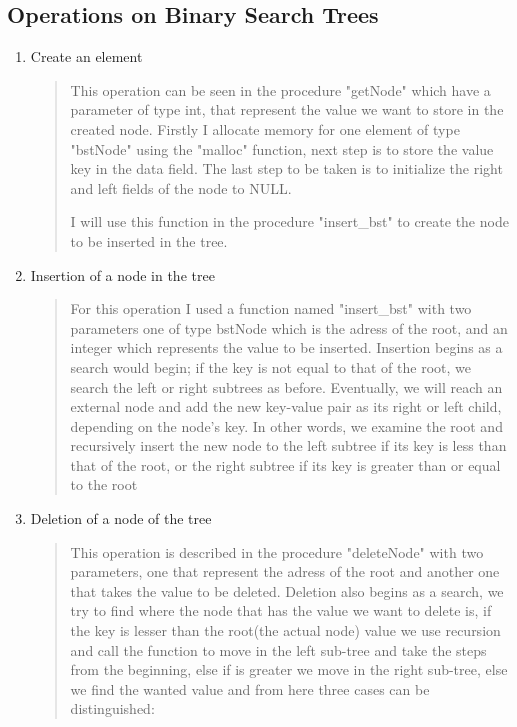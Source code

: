 \documentclass{article}
\begin{document}
\subsection{Operations on Binary Search Trees}
\begin{enumerate}
\item Create an element

\begin{quotation}
This operation can be seen in the procedure "getNode" which have a parameter of type int, that represent the value we want to store in the created node. Firstly I allocate memory for one element of type "bstNode" using the "malloc" function, next step is to store the value key in the data field. The last step to be taken is to initialize the right and left fields of the node to NULL.

I will use this function in the procedure "insert\_bst" to create the node to be inserted in the tree.
\end{quotation}
\item Insertion of a node in the tree
\begin{quotation}
For this operation I used a function named "insert\_bst" with two parameters one of type bstNode which is the adress of the root, and an integer which represents the value to be inserted. Insertion begins as a search would begin; if the key is not equal to that of the root,
we search the left or right subtrees as before. Eventually, we will reach an external node and add the new key-value pair  as its right or left child, depending on the node's key. In other words, we examine the root and recursively insert the new node to the left subtree if its key is less than that of the root, or the right subtree if its key is greater than or equal to the root
\end{quotation}
\item Deletion of a node of the tree
\begin{quotation}
This operation is described in the procedure "deleteNode" with two parameters, one that represent the adress of the root and another one that takes the value to be deleted. Deletion also begins as a search, we try to find where the node that has the value we want to delete is, if the key is lesser than the root(the actual node) value we use recursion and call the function to move in the left sub-tree and take the steps from the beginning, else if is greater we move in the right sub-tree, else we find the wanted value and from here three cases can be distinguished:
\begin{itemize}

\end{itemize}
\end{quotation}
\end{enumerate}
\end{document}
